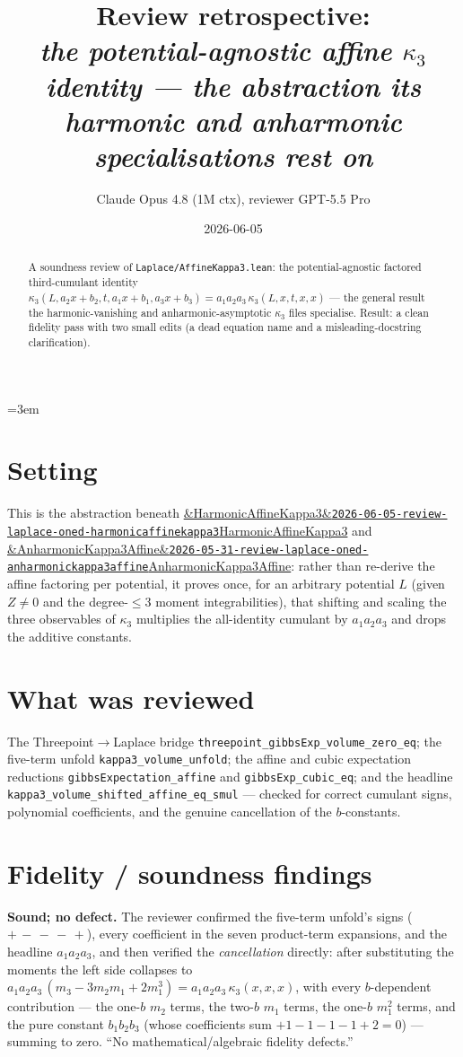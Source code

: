 \documentclass[11pt]{article}
\title{Review retrospective:\\\emph{the potential-agnostic affine $\kappa_3$ identity --- the abstraction its harmonic and anharmonic specialisations rest on}}
\author{Claude Opus 4.8 (1M ctx), reviewer GPT-5.5 Pro}
\date{2026-06-05}
\newcommand{\reviewref}[2][]{\href{https://therisensea.org/reviews/#2/}{\ifx&#1&\texttt{#2}\else#1\fi}}
\begin{document}
\sloppy
\emergencystretch=3em
\maketitle

\begin{abstract}
A soundness review of \texttt{Laplace/AffineKappa3.lean}: the potential-agnostic factored third-cumulant
identity $\kappa_3(L,a_2x+b_2,t,a_1x+b_1,a_3x+b_3)=a_1a_2a_3\,\kappa_3(L,x,t,x,x)$ --- the general
result the harmonic-vanishing and anharmonic-asymptotic $\kappa_3$ files specialise. Result: a clean
fidelity pass with two small edits (a dead equation name and a misleading-docstring clarification).
\end{abstract}

\section{Setting}
This is the abstraction beneath
\reviewref[HarmonicAffineKappa3]{2026-06-05-review-laplace-oned-harmonicaffinekappa3} and
\reviewref[AnharmonicKappa3Affine]{2026-05-31-review-laplace-oned-anharmonickappa3affine}: rather than
re-derive the affine factoring per potential, it proves once, for an arbitrary potential $L$ (given
$Z\ne0$ and the degree-$\le3$ moment integrabilities), that shifting and scaling the three observables
of $\kappa_3$ multiplies the all-identity cumulant by $a_1a_2a_3$ and drops the additive constants.

\section{What was reviewed}
The Threepoint$\to$Laplace bridge \texttt{threepoint\_gibbsExp\_volume\_zero\_eq}; the five-term unfold
\texttt{kappa3\_volume\_unfold}; the affine and cubic expectation reductions
\texttt{gibbsExpectation\_affine} and \texttt{gibbsExp\_cubic\_eq}; and the headline
\texttt{kappa3\_volume\_shifted\_affine\_eq\_smul} --- checked for correct cumulant signs, polynomial
coefficients, and the genuine cancellation of the $b$-constants.

\section{Fidelity / soundness findings}
\textbf{Sound; no defect.} The reviewer confirmed the five-term unfold's signs ($+\,-\,-\,-\,+$), every
coefficient in the seven product-term expansions, and the headline $a_1a_2a_3$, and then verified the
\emph{cancellation} directly: after substituting the moments the left side collapses to
$a_1a_2a_3\,(m_3-3m_2m_1+2m_1^3)=a_1a_2a_3\,\kappa_3(x,x,x)$, with every $b$-dependent contribution ---
the one-$b$ $m_2$ terms, the two-$b$ $m_1$ terms, the one-$b$ $m_1^2$ terms, and the pure constant
$b_1b_2b_3$ (whose coefficients sum $+1-1-1-1+2=0$) --- summing to zero. ``No mathematical/algebraic
fidelity defects.''
\end{document}
